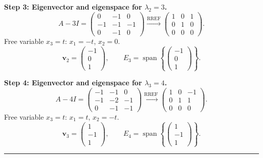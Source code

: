 \documentclass[12pt,a3paper]{article}
\begin{document}
\begin{tcolorbox}
\textbf{Step 3: Eigenvector and eigenspace for $\lambda_2=3$.}
\[
  A-3I = \begin{pmatrix}0&-1&0\\-1&-1&-1\\0&-1&0\end{pmatrix}
  \xrightarrow{\text{RREF}}
  \begin{pmatrix}1&0&1\\0&1&0\\0&0&0\end{pmatrix}.
\]
Free variable $x_3=t$: $x_1=-t$, $x_2=0$.
\[
  \mathbf{v}_2=\begin{pmatrix}-1\\0\\1\end{pmatrix}, \qquad
  E_3 = \operatorname{span}\!\left\{\begin{pmatrix}-1\\0\\1\end{pmatrix}\right\}.
\]

\textbf{Step 4: Eigenvector and eigenspace for $\lambda_3=4$.}
\[
  A-4I = \begin{pmatrix}-1&-1&0\\-1&-2&-1\\0&-1&-1\end{pmatrix}
  \xrightarrow{\text{RREF}}
  \begin{pmatrix}1&0&-1\\0&1&1\\0&0&0\end{pmatrix}.
\]
Free variable $x_3=t$: $x_1=t$, $x_2=-t$.
\[
  \mathbf{v}_3=\begin{pmatrix}1\\-1\\1\end{pmatrix}, \qquad
  E_4 = \operatorname{span}\!\left\{\begin{pmatrix}1\\-1\\1\end{pmatrix}\right\}.
\]

\medskip\textcolor{cE}{\rule{\textwidth}{0.4pt}}


\end{tcolorbox}
\end{document}
